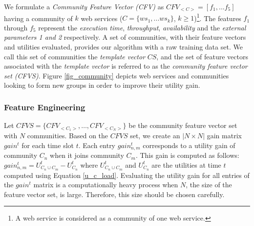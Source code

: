 \documentclass[11pt,onecolumn]{IEEEtran}
\begin{document}
We formulate a \emph{Community Feature Vector (CFV)} as $CFV_{<C>} = [f_1,...f_5]$ having a community of $k$ web services ($C = \{ws_1,...ws_k\}$, $k \geq 1$)\footnote{A web service is considered as a community of one web service.}. The features $f_1$ through $f_5$ represent the \emph{execution time}, \emph{throughput}, \emph{availability} and the \emph{external parameters 1 and 2} respectively. A set of communities, with their feature vectors and utilities evaluated, provides our algorithm with a raw training data set. We call this set of communities the \emph{template vector} $CS$, and the set of feature vectors associated with the \emph{template vector} is referred to as the \emph{community feature vector set (CFVS)}. Figure \ref{fig_community} depicts web services and communities looking to form new groups in order to improve their utility gain.

\subsubsection{Feature Engineering}\label{sss:feng}
Let $CFVS = \{CFV_{<C_1>}, \dots, CFV_{<C_N>}\}$ be the community feature vector set with $N$ communities. Based on the $CFVS$ set, we create an $|N \times N|$ gain matrix $gain^{t}$ for each time slot $t$. Each entry $gain_{n,m}^{t}$ corresponds to a utility gain of community $C_n$ when it joins community $C_m$. This gain is computed as follows: $gain_{n,m}^{t} = U_{C_n \cup C_m}^{t} - U_{C_{n}}^{t}$ where $U_{C_n \cup C_m}^{t}$ and $U_{C_{n}}^{t}$ are the utilities at time $t$ computed using Equation \ref{u_c_load}.  Evaluating the utility gain for all entries of the $gain^t$ matrix is a computationally heavy process when $N$, the size  of the feature vector set, is large. Therefore, this size should be chosen carefully. 
\end{document}
